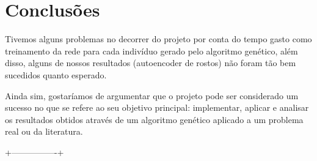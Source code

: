 \documentclass[twoside,conference,a4paper]{IEEEtran}
\begin{document}
\section{Conclusões}

Tivemos alguns problemas no decorrer do projeto por conta do tempo gasto como treinamento da rede para cada indivíduo gerado pelo algoritmo genético, além disso, alguns de nossos resultados (autoencoder de rostos) não foram tão bem sucedidos quanto esperado.

Ainda sim, gostaríamos de argumentar que o projeto pode ser considerado um sucesso no que se refere ao seu objetivo principal: implementar, aplicar e analisar os resultados obtidos através de um algoritmo genético aplicado a um problema real ou da literatura.


\cite{Rowling:1997}


 +----------------+






\end{document}
